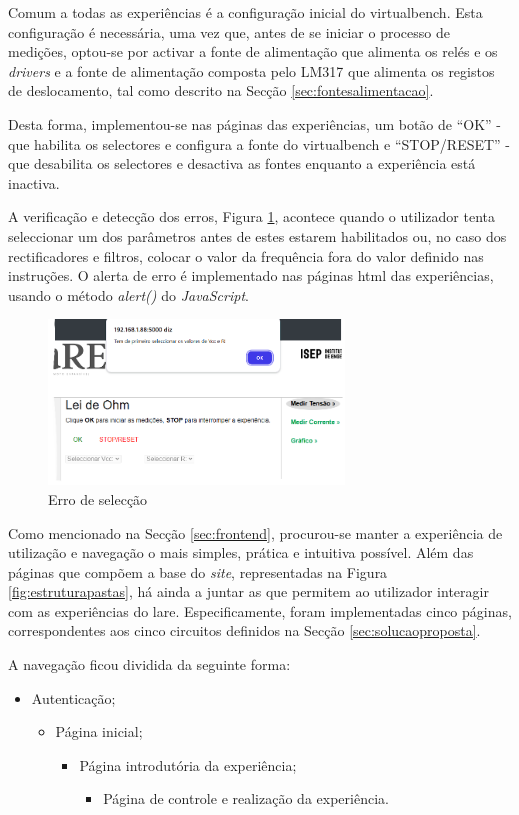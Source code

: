 Comum a todas as experiências é a configuração inicial do \acrshort{virtualbench}. Esta configuração é necessária, uma vez que, antes de se iniciar o processo de medições, optou-se por activar a fonte de alimentação que alimenta os relés e os \textit{drivers} e a fonte de alimentação composta pelo LM317 que alimenta os registos de deslocamento, tal como descrito na Secção \ref{sec:fontesalimentacao}. 

Desta forma, implementou-se nas páginas das experiências, um botão de ``OK'' - que habilita os selectores e configura a fonte do \acrshort{virtualbench} e ``STOP/RESET'' - que desabilita os selectores e desactiva as fontes enquanto a experiência está inactiva. 

A verificação e detecção dos erros, Figura \ref{fig:erropagina}, acontece quando o utilizador tenta seleccionar um dos parâmetros antes de estes estarem habilitados ou, no caso dos rectificadores e filtros, colocar o valor da frequência fora do valor definido nas instruções. O alerta de erro é implementado nas páginas \acrshort{html} das experiências, usando o método \textit{alert()} do \textit{JavaScript}.

\begin{figure}[hbtp]
	\centering
	\includegraphics[width=0.7\textwidth]{figures/erro_pagina.png}
	\caption{Erro de selecção}
	\label{fig:erropagina}
\end{figure}

Como mencionado na Secção \ref{sec:frontend}, procurou-se manter a experiência de utilização e navegação o mais simples, prática e intuitiva possível. Além das páginas que compõem a base do \textit{site}, representadas na Figura \ref{fig:estruturapastas}, há ainda a juntar as que permitem ao utilizador interagir com as experiências do \acrshort{lare}. Especificamente, foram implementadas cinco páginas, correspondentes aos cinco circuitos definidos na Secção \ref{sec:solucaoproposta}.

A navegação ficou dividida da seguinte forma:
\begin{itemize}
	\item Autenticação;
	\begin{itemize}
		\item Página inicial;
		\begin{itemize}
			\item Página introdutória da experiência;
			\begin{itemize}
				\item Página de controle e realização da experiência.
			\end{itemize}
		\end{itemize}
	\end{itemize}
\end{itemize}

